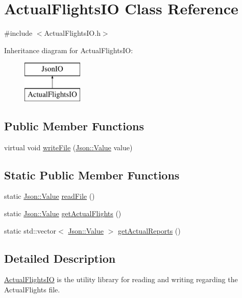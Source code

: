 \hypertarget{class_actual_flights_i_o}{}\section{Actual\+Flights\+I\+O Class Reference}
\label{class_actual_flights_i_o}


{\ttfamily \#include $<$Actual\+Flights\+I\+O.\+h$>$}

Inheritance diagram for Actual\+Flights\+I\+O\+:\begin{figure}[H]
\begin{center}
\leavevmode
\includegraphics[height=2.000000cm]{class_actual_flights_i_o}
\end{center}
\end{figure}
\subsection*{Public Member Functions}
\begin{DoxyCompactItemize}
\item 
virtual void \hyperlink{class_actual_flights_i_o_a181dc53214b2e3d7d21c28d928e5f07b}{write\+File} (\hyperlink{class_json_1_1_value}{Json\+::\+Value} value)
\end{DoxyCompactItemize}
\subsection*{Static Public Member Functions}
\begin{DoxyCompactItemize}
\item 
static \hyperlink{class_json_1_1_value}{Json\+::\+Value} \hyperlink{class_actual_flights_i_o_ae69ccbdf62e74023d2e6bf71232a55f3}{read\+File} ()
\item 
static \hyperlink{class_json_1_1_value}{Json\+::\+Value} \hyperlink{class_actual_flights_i_o_a9ea172304485a41da1d8615878ffb93f}{get\+Actual\+Flights} ()
\item 
static std\+::vector$<$ \hyperlink{class_json_1_1_value}{Json\+::\+Value} $>$ \hyperlink{class_actual_flights_i_o_ae9529e787a486c0713df9351b77bb1f6}{get\+Actual\+Reports} ()
\end{DoxyCompactItemize}


\subsection{Detailed Description}
\hyperlink{class_actual_flights_i_o}{Actual\+Flights\+I\+O} is the utility library for reading and writing regarding the Actual\+Flights file. 

